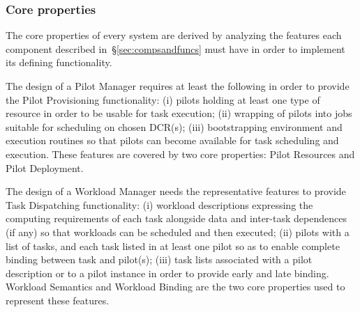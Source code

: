 \documentclass{sig-alternate}
\begin{document}

\subsubsection{Core properties}
\label{sec:coreprops}

The core properties of every \pilot system are derived by analyzing the features
each component described in~\S\ref{sec:compsandfuncs} must have in order to
implement its defining functionality.

The design of a Pilot Manager requires at least the following in order to
provide the Pilot Provisioning functionality: (i) pilots holding at least one
type of resource in order to be usable for task execution; (ii) wrapping of
pilots into jobs suitable for scheduling on chosen DCR(s); (iii) bootstrapping
environment and execution routines so that pilots can become available for task
scheduling and execution. These features are covered by two core properties:
Pilot Resources and Pilot Deployment.

The design of a Workload Manager needs the representative features to provide
Task Dispatching functionality: (i) workload descriptions expressing the
computing requirements of each task alongside data and inter-task dependences
(if any) so that workloads can be scheduled and then executed; (ii) pilots with
a list of tasks, and each task listed in at least one pilot so as to enable
complete binding between task and pilot(s); (iii) task lists associated with a
pilot description or to a pilot instance in order to provide early and late
binding. Workload Semantics and Workload Binding are the two core properties
used to represent these features.
\end{document}
